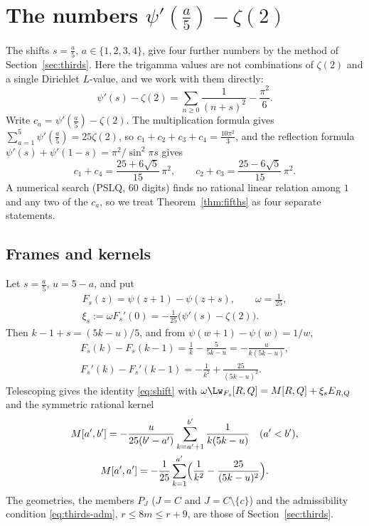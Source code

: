 \section{The numbers $\psi'(\frac a5)-\zeta(2)$}\label{sec:fifths}

The shifts $s=\frac a5$, $a\in\{1,2,3,4\}$, give four further numbers by the method of Section~\ref{sec:thirds}. Here the trigamma values
are not combinations of $\zeta(2)$ and a single Dirichlet $L$-value, and we work with them directly:
\[
 \psi'(s)-\zeta(2)=\sum_{n\ge0}\frac1{(n+s)^2}-\frac{\pi^2}6 .
\]
Write $c_a=\psi'(\frac a5)-\zeta(2)$. The multiplication formula gives $\sum_{a=1}^5\psi'(\frac a5)=25\zeta(2)$, so
$c_1+c_2+c_3+c_4=\frac{10\pi^2}3$, and the reflection formula $\psi'(s)+\psi'(1-s)=\pi^2/\sin^2\pi s$ gives
\[
 c_1+c_4=\frac{25+6\sqrt5}{15}\,\pi^2,\qquad c_2+c_3=\frac{25-6\sqrt5}{15}\,\pi^2 .
\]
A numerical search (PSLQ, $60$ digits) finds no rational linear relation among $1$ and any two of the $c_a$, so we treat
Theorem~\ref{thm:fifths} as four separate statements.

\subsection{Frames and kernels}
Let $s=\frac a5$, $u=5-a$, and put
\[
\begin{gathered}
 F_s(z)=\psi(z+1)-\psi(z+s),\qquad \omega=\tfrac1{25},\\
 \xi_s:=\omega F_s'(0)=-\frac1{25}\bigl(\psi'(s)-\zeta(2)\bigr).
\end{gathered}
\]
Then $k-1+s=(5k-u)/5$, and from $\psi(w+1)-\psi(w)=1/w$,
\[
\begin{gathered}
 F_s(k)-F_s(k-1)=\frac1k-\frac5{5k-u}=-\frac{u}{k(5k-u)},\\
 F_s'(k)-F_s'(k-1)=-\frac1{k^2}+\frac{25}{(5k-u)^2}.
\end{gathered}
\]
Telescoping gives the identity \eqref{eq:shift} with $\omega\Lw_{F_s}[R,Q]=M[R,Q]+\xi_sE_{R,Q}$ and the symmetric rational kernel
\[
\begin{gathered}
 M[a',b']=-\frac{u}{25(b'-a')}\sum_{k=a'+1}^{b'}\frac1{k(5k-u)}\quad(a'<b'),\\
 M[a',a']=-\frac1{25}\sum_{k=1}^{a'}\Bigl(\frac1{k^2}-\frac{25}{(5k-u)^2}\Bigr).
\end{gathered}
\]
The geometries, the members $P_J$ ($J=C$ and $J=C\setminus\{c\}$) and the admissibility condition \eqref{eq:thirds-adm},
$r\le8m\le r+9$, are those of Section~\ref{sec:thirds}.

